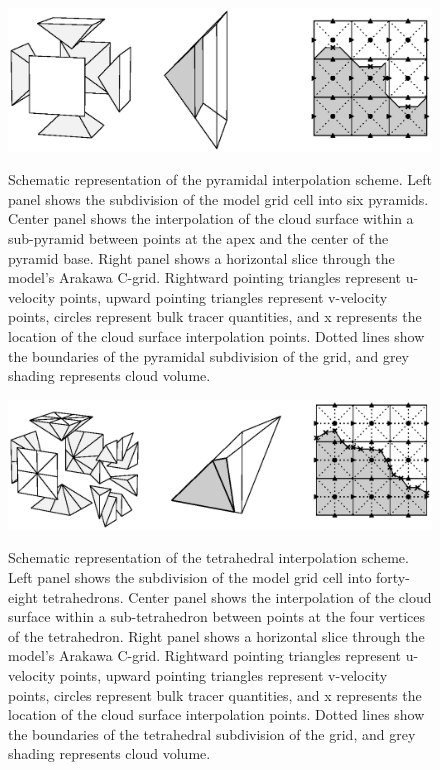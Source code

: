 \documentclass[12pt]{article}
\begin{document}
\begin{figure}[t]
  \noindent\includegraphics[width=40pc,angle=0]{./figures/pyramid_scheme}\\
  \caption{Schematic representation of the pyramidal interpolation scheme.
Left panel shows the subdivision of the model grid cell into six pyramids.  
Center panel shows the interpolation of the cloud surface within a 
sub-pyramid between points at the  apex and the center of the pyramid base.  
Right panel shows a horizontal slice through the model's Arakawa C-grid.  
Rightward pointing triangles represent u-velocity points, upward pointing 
triangles represent v-velocity points, circles represent bulk tracer 
quantities, and x represents the location of the cloud surface interpolation
points.  Dotted lines show the boundaries of the pyramidal subdivision of the 
grid, and grey shading represents cloud volume.}\label{fig:pyramid_scheme}
\end{figure}

\begin{figure}[t]
  \noindent\includegraphics[width=40pc,angle=0]{./figures/tetrahedral_scheme}\\
  \caption{Schematic representation of the tetrahedral interpolation 
scheme.  Left panel shows the subdivision of the model grid cell into forty-
eight tetrahedrons.  Center panel shows the interpolation of the cloud surface
within a sub-tetrahedron between points at the four vertices of the 
tetrahedron.  Right panel shows a horizontal slice through the model's Arakawa 
C-grid.  Rightward pointing triangles represent u-velocity points, upward 
pointing triangles represent v-velocity points, circles represent bulk tracer
quantities, and x represents the location of the cloud surface interpolation
points.  Dotted lines show the boundaries of the tetrahedral subdivision of the 
grid, and grey shading represents cloud volume.}\label{fig:tetrahedral_scheme}
\end{figure}
\end{document}
